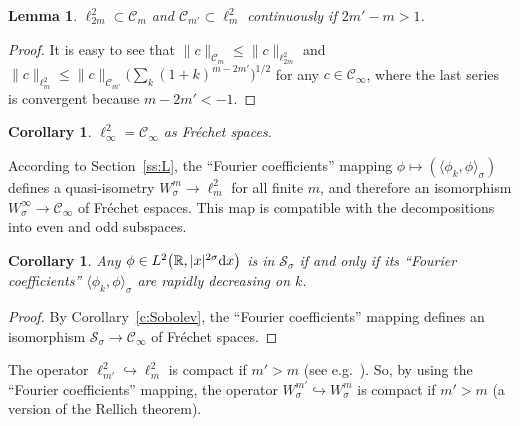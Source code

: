 \documentclass[pdftex]{sigma}
\newtheorem{Corollary}[Theorem]{Corollary}
\newtheorem{Lemma}[Theorem]{Lemma}
\newcommand{\R}{\mathbb{R}}
\newcommand{\CC}{\mathcal{C}}
\renewcommand{\SS}{\mathcal{S}}
\begin{document}
\begin{Lemma}\label{l:ell 2 2m subset CC m}
  $\ell^2_{2m}\subset\CC_m$ and $\CC_{m'}\subset\ell^2_m$ continuously if $2m'-m>1$.
\end{Lemma}

\begin{proof}
  It is easy to see that $\|c\|_{\CC_m}\le\|c\|_{\ell^2_{2m}}$ and $ \|c\|_{\ell^2_m}\le\|c\|_{\CC_{m'}}\big(\sum_k(1+k)^{m-2m'}\big)^{1/2}$ for any $c\in\CC_\infty$, where the last series is convergent because $m-2m'<-1$.
\end{proof}

\begin{Corollary}\label{c:ell 2 infty=CC}
  $\ell^2_\infty=\CC_\infty$ as Fr\'echet spaces.
\end{Corollary}

According to Section~\ref{ss:L}, the ``Fourier coef\/f\/icients'' mapping $\phi\mapsto(\langle\phi_k,\phi\rangle_\sigma)$ def\/ines a quasi-isometry $W_\sigma^m\to\ell^2_m$ for all f\/inite $m$, and therefore an isomorphism $W_\sigma^\infty\to\CC_\infty$ of Fr\'echet espaces. This map is compatible with the decompositions into even and odd subspaces.

\begin{Corollary}\label{c:SS_sigma, rapidly degreasing Fourier coefficients}
  Any $\phi\in L^2\big(\R,|x|^{2\sigma}{\rm d}x\big)$ is in $\SS_\sigma$ if and only if its ``Fourier coefficients'' $\langle\phi_k,\phi\rangle_\sigma$ are rapidly decreasing on $k$.
\end{Corollary}

\begin{proof}
  By Corollary~\ref{c:Sobolev}, the ``Fourier coef\/f\/icients'' mapping def\/ines an isomorphism $\SS_\sigma\to\CC_\infty$ of Fr\'echet spaces.
\end{proof}

The operator $\ell^2_{m'}\hookrightarrow\ell^2_m$ is compact if $m'>m$ (see e.g.\ \cite[Theorem 5.8]{Roe1998}). So, by using  the ``Fourier coef\/f\/icients'' mapping, the operator $W_\sigma^{m'}\hookrightarrow W_\sigma^m$ is compact if $m'>m$ (a version of the Rellich theorem).
\end{document}
